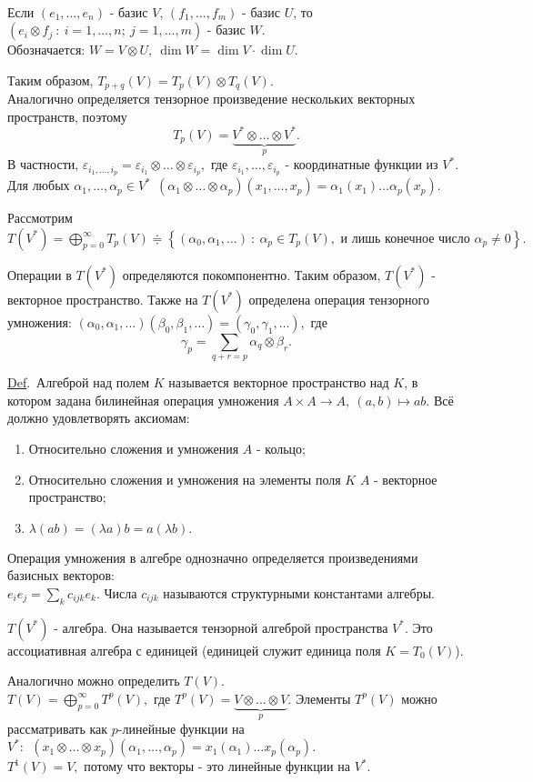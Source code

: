 \documentclass[draft]{article}%
\newcommand{\eps}{\varepsilon}
\newcommand{\de}{\par\noindent\underline{Def}.\ }%
\newcommand{\ab}{\par\noindent}%
\newcommand{\baz}[1]{\left(#1_1,\dots,#1_n\right)}%
\newcommand{\ty}{\otimes}
\begin{document}
\\
Если $\baz{e}$ - базис $V$, $(f_1,\dots,f_m)$ - базис $U$, то $(e_i\ty f_j\ :\ i=1,\dots,n;\ j=1,\dots,m)$ - базис $W$.
\\
Обозначается: $W=V\ty U,\ \dim W=\dim V\cdot\dim U.$
\ab
Таким образом, $T_{p+q}(V)=T_p(V)\ty T_q(V).$
\\
Аналогично определяется тензорное произведение нескольких векторных пространств, поэтому
$$T_p(V)=\underbrace{V^*\ty\dots\ty V^*}_p.$$
В частности, $\eps_{i_1,\dots,i_p}=\eps_{i_1}\ty\dots\ty\eps_{i_p},$ где $\eps_{i_1},\dots,\eps_{i_p}$ - координатные функции
из $V^*.$ Для любых $\alpha_1,\dots,\alpha_p\in V^*\ \ (\alpha_1\ty\dots\ty\alpha_p)(x_1,\dots,x_p)=\alpha_1(x_1)\dots\alpha_p(x_p).$
\ab Рассмотрим $T(V^*)=\bigoplus\limits_{p=0}^\infty T_p(V)\doteqdot\left\{(\alpha_0,\alpha_1,\dots)\ :\
\alpha_p\in T_p(V),\mbox{ и лишь конечное число }\alpha_p\ne 0\right\}.$
\ab Операции в $T(V^*)$ определяются покомпонентно. Таким образом, $T(V^*)$ - векторное пространство.
Также на $T(V^*)$ определена операция тензорного умножения:
$(\alpha_0,\alpha_1,\dots)(\beta_0,\beta_1,\dots)=(\gamma_0,\gamma_1,\dots),$ где
$$
\gamma_p=\sum_{q+r=p}\alpha_q\ty\beta_r.
$$
\de Алгеброй над полем $K$ называется векторное пространство над $K$, в котором задана билинейная операция
умножения $A\times A\rightarrow A,\ (a,b)\mapsto ab.$ Всё должно удовлетворять аксиомам:
\begin{enumerate}
    \item Относительно сложения и умножения $A$ - кольцо;
    \item Относительно сложения и умножения на элементы поля $K$ $A$ - векторное пространство;
    \item $\lambda(ab)=(\lambda a)b=a(\lambda b).$
\end{enumerate}
Операция умножения в алгебре однозначно определяется произведениями базисных векторов:\\
$e_ie_j=\sum\limits_kc_{ijk}e_k.$ Числа $c_{ijk}$ называются структурными константами алгебры.
\ab $T(V^*)$ - алгебра. Она называется тензорной алгеброй пространства $V^*$. Это ассоциативная алгебра
с единицей (единицей служит единица поля $K=T_0(V)$).
\ab Аналогично можно определить $T(V).$\\
$T(V)=\bigoplus\limits_{p=0}^\infty T^p(V),$ где $T^p(V)=\underbrace{V\ty\dots\ty V}_p.$ Элементы $T^p(V)$ можно
рассматривать как $p$-линейные функции на $V^*:\ \ (x_1\ty\dots\ty x_p)(\alpha_1,\dots,\alpha_p)=
x_1(\alpha_1)\dots x_p(\alpha_p).$\\
$T^1(V)=V,$ потому что векторы - это линейные функции на $V^*.$
\end{document}
